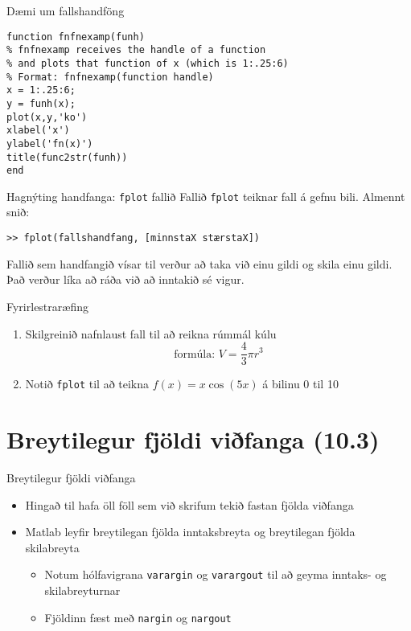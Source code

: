 \documentclass[handout]{beamer}
\begin{document}
\begin{frame}[fragile]{Dæmi um fallshandföng}
\begin{verbatim}
function fnfnexamp(funh)
% fnfnexamp receives the handle of a function
% and plots that function of x (which is 1:.25:6)
% Format: fnfnexamp(function handle)
x = 1:.25:6;
y = funh(x);
plot(x,y,'ko')
xlabel('x')
ylabel('fn(x)')
title(func2str(funh))
end
\end{verbatim}

\end{frame}

\begin{frame}[fragile]{Hagnýting handfanga: \texttt{fplot} fallið}
Fallið \texttt{fplot} teiknar fall á gefnu bili. Almennt snið:
\begin{verbatim}
>> fplot(fallshandfang, [minnstaX stærstaX])
\end{verbatim}
Fallið sem handfangið vísar til verður að taka við einu gildi og skila einu gildi. Það verður líka að ráða við að inntakið sé vigur.
\end{frame}

\begin{frame}{Fyrirlestraræfing}
    \begin{enumerate}
     \item Skilgreinið nafnlaust fall til að reikna rúmmál kúlu
     \[
      \text{formúla: } V = \frac{4}{3} \pi r^3
     \]
     \item Notið \texttt{fplot} til að teikna $f(x) = x\cos(5x)$ á bilinu 0 til 10
    \end{enumerate}
\end{frame}

\section{Breytilegur fjöldi viðfanga (10.3)}

\begin{frame}{Breytilegur fjöldi viðfanga}
\begin{itemize}
 \item Hingað til hafa öll föll sem við skrifum tekið fastan fjölda viðfanga
 \item Matlab leyfir breytilegan fjölda inntaksbreyta og breytilegan fjölda skilabreyta
 \begin{itemize}
  \item Notum hólfavigrana \texttt{varargin} og \texttt{varargout} til að geyma inntaks- og skilabreyturnar
  \item Fjöldinn fæst með \texttt{nargin} og \texttt{nargout}
 \end{itemize}
\end{itemize}
\end{frame}
\end{document}
